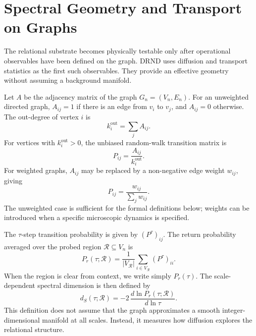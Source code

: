 \documentclass[12pt]{iopart}
\begin{document}
\section{Spectral Geometry and Transport on Graphs}
\label{sec:spectral_transport}

The relational substrate becomes physically testable only after operational observables have been defined on the graph. DRND uses diffusion and transport statistics as the first such observables. They provide an effective geometry without assuming a background manifold.

Let \(A\) be the adjacency matrix of the graph \(G_n=(V_n,E_n)\). For an unweighted directed graph, \(A_{ij}=1\) if there is an edge from \(v_i\) to \(v_j\), and \(A_{ij}=0\) otherwise. The out-degree of vertex \(i\) is
\begin{equation}
k_i^{\mathrm{out}}=\sum_j A_{ij}.
\end{equation}
For vertices with \(k_i^{\mathrm{out}}>0\), the unbiased random-walk transition matrix is
\begin{equation}
P_{ij}=\frac{A_{ij}}{k_i^{\mathrm{out}}}.
\label{eq:transition_matrix}
\end{equation}
For weighted graphs, \(A_{ij}\) may be replaced by a non-negative edge weight \(w_{ij}\), giving
\begin{equation}
P_{ij}=\frac{w_{ij}}{\sum_j w_{ij}}.
\end{equation}
The unweighted case is sufficient for the formal definitions below; weights can be introduced when a specific microscopic dynamics is specified.

The \(\tau\)-step transition probability is given by \((P^\tau)_{ij}\). The return probability averaged over the probed region \(\mathcal{R}\subseteq V_n\) is
\begin{equation}
P_r(\tau;\mathcal{R})
=
\frac{1}{|V_{\mathcal{R}}|}
\sum_{i\in V_{\mathcal{R}}}
(P^\tau)_{ii}.
\label{eq:return_probability_region}
\end{equation}
When the region is clear from context, we write simply \(P_r(\tau)\). The scale-dependent spectral dimension is then defined by
\begin{equation}
d_S(\tau;\mathcal{R})
=
-2\,\frac{d\ln P_r(\tau;\mathcal{R})}{d\ln \tau}.
\label{eq:spectral_dimension}
\end{equation}
This definition does not assume that the graph approximates a smooth integer-dimensional manifold at all scales. Instead, it measures how diffusion explores the relational structure.
\end{document}
